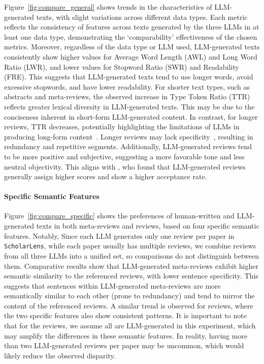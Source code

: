 Figure~\ref{fig:compare_general} shows trends in the characteristics of LLM-generated texts, with slight variations across different data types. Each metric reflects the consistency of features across texts generated by the three LLMs in at least one data type, demonstrating the `comparability' effectiveness of the chosen metrics.
Moreover, regardless of the data type or LLM used, LLM-generated texts consistently show higher values for Average Word Length (AWL) and Long Word Ratio (LWR), and lower values for Stopword Ratio (SWR) and Readability (FRE). This suggests that LLM-generated texts tend to use longer words, avoid excessive stopwords, and have lower readability.
For shorter text types, such as abstracts and meta-reviews, the observed increase in Type Token Ratio (TTR) reflects greater lexical diversity in LLM-generated texts.
This may be due to the conciseness inherent in short-form LLM-generated content. In contrast, for longer reviews, TTR decreases, potentially highlighting the limitations of LLMs in producing long-form content~\cite{wang-etal-2024-m4, wu2025survey}. Longer reviews may lack specificity~\cite{du-etal-2024-llms}, resulting in redundancy and repetitive segments.
Additionally, LLM-generated reviews tend to be more positive and subjective, suggesting a more favorable tone and less neutral objectivity. This aligns with \citet{jin-etal-2024-agentreview}, who found that LLM-generated reviews generally assign higher scores and show a higher acceptance rate.

\paragraph{Specific Semantic Features}
Figure~\ref{fig:compare_specific} shows the preferences of human-written and LLM-generated texts in both meta-reviews and reviews, based on four specific semantic features.
Notably, Since each LLM generates only one review per paper in \texttt{ScholarLens}, while each paper usually has multiple reviews, we combine reviews from all three LLMs into a unified set, so comparisons do not distinguish between them.
Comparative results show that LLM-generated meta-reviews exhibit higher semantic similarity to the referenced reviews, with lower sentence specificity.
This suggests that sentences within LLM-generated meta-reviews are more semantically similar to each other (prone to redundancy) and tend to mirror the content of the referenced reviews. 
A similar trend is observed for reviews, where the two specific features also show consistent patterns.
It is important to note that for the reviews, we assume all are LLM-generated in this experiment, which may amplify the differences in these semantic features. In reality, having more than two LLM-generated reviews per paper may be uncommon, which would likely reduce the observed disparity.

